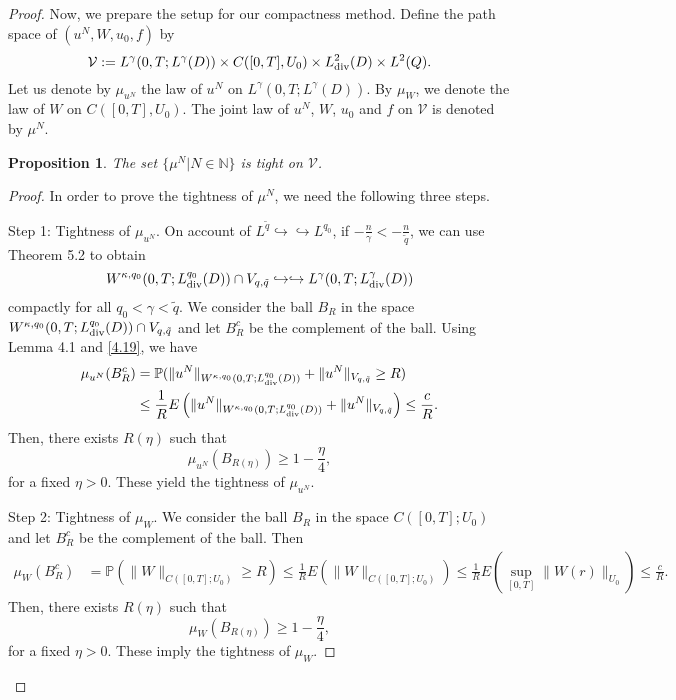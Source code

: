 \documentclass[reqno]{amsart}
\newtheorem{Proposition}{Proposition}[section]
\theoremstyle{definition}
\theoremstyle{remark}
\numberwithin{equation}{section} \allowdisplaybreaks
\begin{document}
\begin{proof}
Now, we prepare the setup for our compactness method. Define the
path space of $(u^N,W,u_0,f)$ by
$$\mathcal{V}:=L^\gamma(0,T;L^\gamma(D))\times C([0,T],{U}_0)\times L^2_{\rm{div}}(D)\times L^2(Q).$$
Let us denote by $\mu_{u^N}$ the law of $u^N$ on
$L^\gamma(0,T;L^\gamma(D))$. By $\mu_{W}$, we denote the law of $W$
on $C([0,T],{U}_0)$. %
The joint law of $u^N$, $W$, $u_0$ and $f$ on $\mathcal{V}$ is
denoted by $\mu^N$.
\begin{Proposition}
The set $\{\mu^N|N\in\mathbb{N}\}$ is tight on $\mathcal{V}$.
\end{Proposition}
\begin{proof}
In order to prove the tightness of $\mu^N$, we need  the following
three steps.

{Step 1: Tightness of $\mu_{u^N}$.} %
On account of $L^{\tilde{q}}\hookrightarrow\hookrightarrow L^{q_0}$,
if $-\frac{n}{\gamma}<-\frac{n}{\tilde{q}}$, we can use Theorem 5.2
\cite{HA} to obtain
$$W^{\kappa,q_0}(0,T;L_{\rm{div}}^{q_0}(D))\cap V_{q,\tilde{q}}\hookrightarrow\hookrightarrow L^\gamma(0,T;L^\gamma_{\rm{div}}(D))$$
compactly for all $q_0<\gamma<\tilde{q}$. We consider the ball $B_R$
in the space $W^{\kappa,q_0}(0,T;L^{q_0}_{\rm{div}}(D))\cap
V_{q,\tilde{q}}$ and let $B_R^c$ be the complement of the ball.
Using Lemma 4.1 and \eqref{4.19}, we have
\begin{align*}
\mu_{u^N}(B_R^c)&=\mathbb{P}(\|u^N\|_{W^{\kappa,q_0}(0,T;L_{\rm{div}}^{q_0}(D))}+\|u^N\|_{V_{q,\tilde{q}}}\geq R)\\
&\leq
\frac{1}{R}E\left(\|u^N\|_{W^{\kappa,q_0}(0,T;L_{\rm{div}}^{q_0}(D))}+\|u^N\|_{V_{q,\tilde{q}}}\right)\leq\frac{c}{R}.
\end{align*}
Then, there exists $R(\eta)$ such that
$$\mu_{u^N}(B_{R(\eta)})\geq 1-\frac{\eta}{4},$$
for a fixed $\eta>0$. These yield the tightness of $\mu_{u^N}$.

{Step 2: Tightness of $\mu_W$.} We consider the ball $B_R$ in the
space $C([0,T];U_0)$ and let $B_R^c$ be the complement of the ball.
Then
\begin{align*}
\mu_W(B_R^c)&=\mathbb{P}(\|W\|_{C([0,T];U_0)}\geq R)\leq
\frac{1}{R}E\left(\|W\|_{C([0,T];U_0)}\right)\leq\frac{1}{R}E\left(\sup_{[0,T]}\|W(r)\|_{U_0}\right)\leq\frac{c}{R} .
\end{align*}
Then, there exists $R(\eta)$ such that
$$\mu_{W}(B_{R(\eta)})\geq 1-\frac{\eta}{4},$$
for a fixed $\eta>0$. These imply the tightness of $\mu_{W}$.



\end{proof}
\end{proof}
\end{document}
